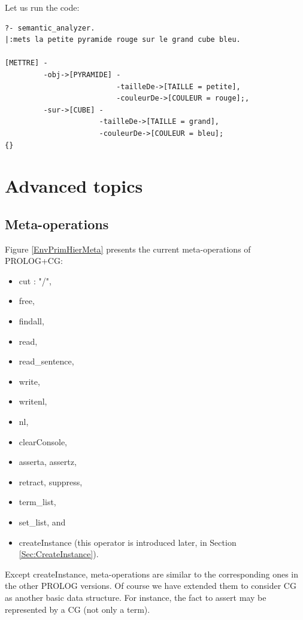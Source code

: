 \documentclass{book}
\begin{document}
Let us run the code:


\begin{verbatim}
?- semantic_analyzer.
|:mets la petite pyramide rouge sur le grand cube bleu.

[METTRE] -
         -obj->[PYRAMIDE] -
                          -tailleDe->[TAILLE = petite],
                          -couleurDe->[COULEUR = rouge];,
         -sur->[CUBE] -
                      -tailleDe->[TAILLE = grand],
                      -couleurDe->[COULEUR = bleu];
{}
\end{verbatim}


\chapter{Advanced topics}

\section{Meta-operations}\label{Sec:MetaOps}

Figure \ref{EnvPrimHierMeta} presents the current meta-operations of
PROLOG+CG:

\begin{itemize}

  \item cut : "/",
  \item free, 
  \item findall,
  \item read, 
  \item read\_sentence, 
  \item write,
  \item writenl, 
  \item nl, 
  \item clearConsole,
  \item asserta, assertz, 
  \item retract, suppress, 
  \item term\_list,
  \item set\_list, and 
  \item createInstance (this operator is introduced later, in Section
\ref{Sec:CreateInstance}).
\end{itemize}

Except createInstance, meta-operations are similar to the
corresponding ones in the other PROLOG versions.  Of course we have
extended them to consider CG as another basic data structure. For
instance, the fact to assert may be represented by a CG (not only a
term).
\end{document}
